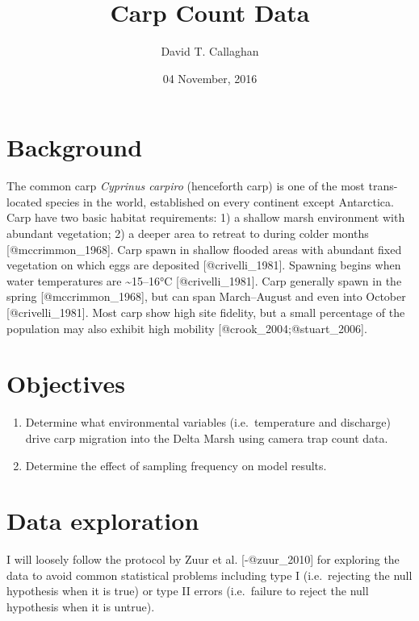 \documentclass[]{article}
\title{Carp Count Data}
\author{David T. Callaghan}
\date{04 November, 2016}
\begin{document}
\maketitle

{
\setcounter{tocdepth}{2}
\tableofcontents
}
\section{Background}\label{background}

The common carp \emph{Cyprinus carpiro} (henceforth carp) is one of the
most trans-located species in the world, established on every continent
except Antarctica. Carp have two basic habitat requirements: 1) a
shallow marsh environment with abundant vegetation; 2) a deeper area to
retreat to during colder months {[}@mccrimmon\_1968{]}. Carp spawn in
shallow flooded areas with abundant fixed vegetation on which eggs are
deposited {[}@crivelli\_1981{]}. Spawning begins when water temperatures
are \textasciitilde{}15--16°C {[}@crivelli\_1981{]}. Carp generally
spawn in the spring {[}@mccrimmon\_1968{]}, but can span March--August
and even into October {[}@crivelli\_1981{]}. Most carp show high site
fidelity, but a small percentage of the population may also exhibit high
mobility {[}@crook\_2004;@stuart\_2006{]}.

\section{Objectives}\label{objectives}

\begin{enumerate}
\def\labelenumi{\arabic{enumi})}
\item
  Determine what environmental variables (i.e.~temperature and
  discharge) drive carp migration into the Delta Marsh using camera trap
  count data.
\item
  Determine the effect of sampling frequency on model results.
\end{enumerate}

\section{Data exploration}\label{data-exploration}

I will loosely follow the protocol by Zuur et al. {[}-@zuur\_2010{]} for
exploring the data to avoid common statistical problems including type I
(i.e.~rejecting the null hypothesis when it is true) or type II errors
(i.e.~failure to reject the null hypothesis when it is untrue).
\end{document}
